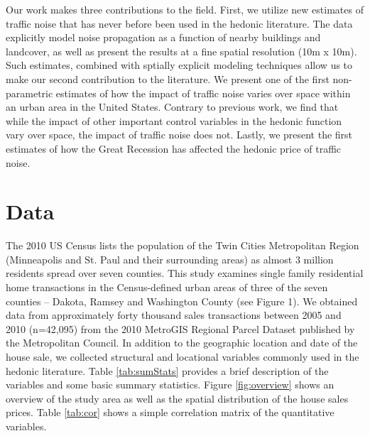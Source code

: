 \documentclass{article}\usepackage{graphicx, color}
\begin{document}
Our work makes three contributions to the field. First, we utilize new estimates of traffic noise that has never before been used in the hedonic literature. The data explicitly model noise propagation as a function of nearby buildings and landcover, as well as present the results at a fine spatial resolution (10m x 10m). Such estimates, combined with sptially explicit modeling techniques allow us to make our second contribution to the literature. We present one of the first non-parametric estimates of how the impact of traffic noise varies over space within an urban area in the United States. Contrary to previous work, we find that while the impact of other important control variables in the hedonic function vary over space, the impact of traffic noise does not. Lastly, we present the first estimates of how the Great Recession has affected the hedonic price of traffic noise.

\section{Data}
The 2010 US Census lists the population of the Twin Cities Metropolitan Region (Minneapolis and St. Paul and their surrounding areas)  as almost 3 million residents spread over seven counties. This study examines single family residential home transactions in the Census-defined urban areas of three of the seven counties – Dakota, Ramsey and Washington County (see Figure 1). We obtained data from approximately forty thousand sales transactions between 2005 and 2010 (n=42,095) from the 2010 MetroGIS Regional Parcel Dataset published by the Metropolitan Council. In addition to the geographic location and date of the house sale, we collected structural and locational variables commonly used in the hedonic literature. Table \ref{tab:sumStats} provides a brief description of the variables and some basic summary statistics. Figure \ref{fig:overview} shows an overview of the study area as well as the spatial distribution of the house sales prices. Table \ref{tab:cor} shows a simple correlation matrix of the quantitative variables.
\end{document}
